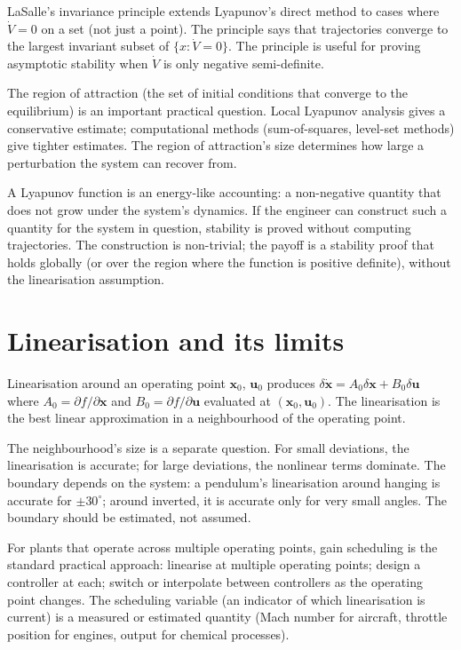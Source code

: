 LaSalle's invariance principle extends Lyapunov's direct method to cases where $\dot{V} = 0$ on a set (not just a point). The principle says that trajectories converge to the largest invariant subset of $\{x : \dot{V} = 0\}$. The principle is useful for proving asymptotic stability when $\dot{V}$ is only negative semi-definite.

The region of attraction (the set of initial conditions that converge to the equilibrium) is an important practical question. Local Lyapunov analysis gives a conservative estimate; computational methods (sum-of-squares, level-set methods) give tighter estimates. The region of attraction's size determines how large a perturbation the system can recover from.

\begin{archetype}
A Lyapunov function is an energy-like accounting: a non-negative quantity that does not grow under the system's dynamics. If the engineer can construct such a quantity for the system in question, stability is proved without computing trajectories. The construction is non-trivial; the payoff is a stability proof that holds globally (or over the region where the function is positive definite), without the linearisation assumption.
\end{archetype}

\section{Linearisation and its limits}

Linearisation around an operating point $\mathbf{x}_0$, $\mathbf{u}_0$ produces $\delta \dot{\mathbf{x}} = A_0 \delta \mathbf{x} + B_0 \delta \mathbf{u}$ where $A_0 = \partial f / \partial \mathbf{x}$ and $B_0 = \partial f / \partial \mathbf{u}$ evaluated at $(\mathbf{x}_0, \mathbf{u}_0)$. The linearisation is the best linear approximation in a neighbourhood of the operating point.

The neighbourhood's size is a separate question. For small deviations, the linearisation is accurate; for large deviations, the nonlinear terms dominate. The boundary depends on the system: a pendulum's linearisation around hanging is accurate for $\pm 30^\circ$; around inverted, it is accurate only for very small angles. The boundary should be estimated, not assumed.

For plants that operate across multiple operating points, gain scheduling is the standard practical approach: linearise at multiple operating points; design a controller at each; switch or interpolate between controllers as the operating point changes. The scheduling variable (an indicator of which linearisation is current) is a measured or estimated quantity (Mach number for aircraft, throttle position for engines, output for chemical processes).

